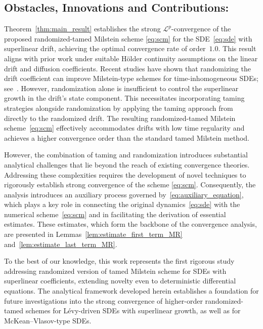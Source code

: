 \documentclass[reqno,  oneside, 12pt]{amsart}
\begin{document}
\subsection*{Obstacles, Innovations and Contributions:}  
	\sloppy
	Theorem~\ref{thm:main_result} establishes the strong $\mathscr{L}^p$-convergence of the proposed randomized-tamed Milstein scheme \eqref{eq:scm} for the SDE~\eqref{eq:sde} with superlinear drift, achieving the optimal convergence rate of order~$1.0$. This result aligns with prior work under suitable H\"older continuity assumptions on the linear drift and diffusion coefficients.
	Recent studies have shown that randomizing the drift coefficient can improve Milstein-type schemes for time-inhomogeneous SDEs; see~\cite{Kruse2019,Pawel2021,Verena2024}. However, randomization alone is insufficient to control the superlinear growth in the drift’s state component. This necessitates incorporating taming strategies alongside randomization by applying the taming approach from~\cite{Kumar2020} directly to the randomized drift.
	The resulting {randomized-tamed Milstein scheme}~\eqref{eq:scm} effectively accommodates drifts with low time regularity and achieves a higher convergence order than the standard tamed Milstein method.


However, the combination of taming and randomization introduces substantial analytical challenges that lie beyond the reach of existing convergence theories. Addressing these complexities requires the development of novel techniques to rigorously establish strong convergence of the scheme \eqref{eq:scm}. Consequently, the analysis introduces an auxiliary process governed by~\eqref{eq:auxiliary_equation}, which plays a key role in connecting the original dynamics~\eqref{eq:sde} with the numerical scheme~\eqref{eq:scm} and in facilitating the derivation of essential estimates. These estimates, which form the backbone of the convergence analysis, are presented in Lemmas~\ref{lem:estimate_first_term_MR} and~\ref{lem:estimate_last_term_MR}.

To the best of our knowledge, this work represents the first rigorous study addressing randomized version of tamed Milstein scheme for SDEs with superlinear coefficients, extending novelty even to deterministic differential equations. The analytical framework developed herein establishes a foundation for future investigations into the strong convergence of higher-order randomized-tamed schemes for L\'evy-driven SDEs with superlinear growth, as well as for McKean–Vlasov-type SDEs.
\end{document}
